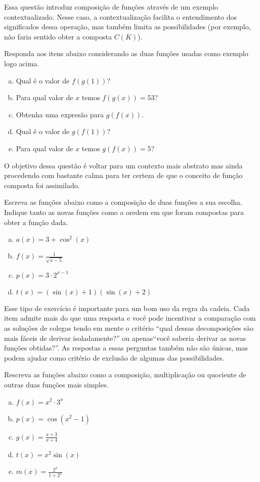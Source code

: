 \documentclass[main_estudante.tex]{subfiles}
\begin{document}
Essa questão introduz composição de funções através de um exemplo contextualizado. Nesse caso, a contextualização facilita o entendimento dos significados dessa operação, mas também limita as possibilidades (por exemplo, não faria sentido obter a composta $C(K)$).

\begin{questao}
Responda aos itens abaixo considerando as duas funções usadas como exemplo logo acima.
\begin{enumerate}[a)]
\item Qual é o valor de $f(g(1))$?
\item Para qual valor de $x$ temos $f(g(x))=53$?
\item Obtenha uma expresão para $g(f(x))$.
\item Qual é o valor de $g(f(1))$?
\item Para qual valor de $x$ temos $g(f(x))=5$?
\end{enumerate}
\end{questao}

O objetivo dessa questão é voltar para um contexto mais abstrato mas ainda procedendo com bastante calma para ter certeza de que o conceito de função composta foi assimilado.

\begin{questao}
Escreva as funções abaixo como a composição de duas funções a sua escolha. Indique tanto as novas funções como a oredem em que foram compostas para obter a função dada.
\begin{enumerate}[a)]
\item $a(x)=3+\cos^2(x)$
\item $f(x)=\frac{1}{\sqrt{x-5}}$
\item $p(x)=3 \cdot 2^{x-1}$
\item $t(x)=(\sin(x)+1)(\sin(x)+2)$
\end{enumerate}
\end{questao}

Esse tipo de exercício é importante para um bom uso da regra da cadeia. Cada item admite mais do que uma resposta e você pode incentivar a comparação com as soluções de colegas tendo em mente o critério ``qual dessas decomposições são mais fáceis de derivar isoladamente?'' ou apenas``você saberia derivar as novas funções obtidas?''. As respostas a essas perguntas também não são únicas, mas podem ajudar como critério de exclusão de algumas das possibilidades.

\begin{questao}
Rescreva as funções abaixo como a composição, multiplicação ou quociente de outras duas funções mais simples.
\begin{enumerate}[a)]
\item $f(x)=x^2 \cdot 3^x$
\item $p(x)=\cos(x^2-1)$
\item $g(x)=\frac{x+3}{x+4}$
\item $t(x)=x^2\sin(x)$
\item $m(x)=\frac{2^x}{1+2^x}$
\end{enumerate}
\end{questao}
\end{document}
